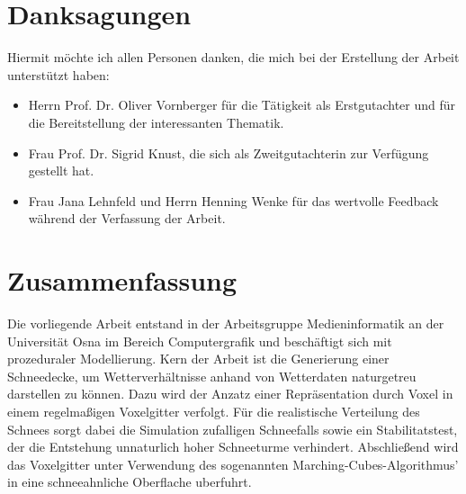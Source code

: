\section{Danksagungen}

Hiermit möchte ich allen Personen danken, die mich bei der Erstellung der Arbeit
unterstützt haben:

\begin{itemize}
\item Herrn Prof. Dr. Oliver Vornberger für die Tätigkeit als Erstgutachter und
für die Bereitstellung der interessanten Thematik.
\item Frau Prof. Dr. Sigrid Knust, die sich als Zweitgutachterin zur Verfügung gestellt hat.
\item Frau Jana Lehnfeld und Herrn Henning Wenke für das wertvolle Feedback
während der Verfassung der Arbeit.
\end{itemize}

\section{Zusammenfassung}

Die vorliegende Arbeit entstand in der Arbeitsgruppe Medieninformatik an der Universität Osna
im Bereich Computergrafik und beschäftigt sich mit prozeduraler Modellierung. Kern
der Arbeit ist die Generierung einer Schneedecke, um Wetterverhältnisse anhand
von Wetterdaten naturgetreu darstellen zu können. Dazu wird der Anzatz einer
Repräsentation durch Voxel in einem regelmaßigen Voxelgitter verfolgt. Für die
realistische Verteilung des Schnees sorgt dabei die Simulation zufalligen
Schneefalls sowie ein Stabilitatstest, der die Entstehung unnaturlich hoher
Schneeturme verhindert. Abschließend wird das Voxelgitter unter Verwendung des
sogenannten Marching-Cubes-Algorithmus’ in eine schneeahnliche Oberflache
uberfuhrt.
